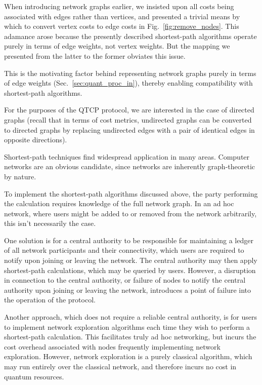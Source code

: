 When introducing network graphs earlier, we insisted upon all costs being associated with edges rather than vertices, and presented a trivial means by which to convert vertex costs to edge costs in Fig.~\ref{fig:remove_nodes}. This adamance arose because the presently described shortest-path algorithms operate purely in terms of edge weights, not vertex weights. But the mapping we presented from the latter to the former obviates this issue.

This is the motivating factor behind representing network graphs purely in terms of edge weights (Sec.~\ref{sec:quant_proc_in}), thereby enabling compatibility with shortest-path algorithms.

For the purposes of the QTCP protocol, we are interested in the case of directed graphs (recall that in terms of cost metrics, undirected graphs can be converted to directed graphs by replacing undirected edges with a pair of identical edges in opposite directions).

Shortest-path techniques find widespread application in many areas. Computer networks are an obvious candidate, since networks are inherently graph-theoretic by nature.

To implement the shortest-path algorithms discussed above, the party performing the calculation requires knowledge of the full network graph. In an ad hoc network, where users might be added to or removed from the network arbitrarily, this isn't necessarily the case.

One solution is for a central authority to be responsible for maintaining a ledger of all network participants and their connectivity, which users are required to notify upon joining or leaving the network. The central authority may then apply shortest-path calculations, which may be queried by users. However, a disruption in connection to the central authority, or failure of nodes to notify the central authority upon joining or leaving the network, introduces a point of failure into the operation of the protocol.

Another approach, which does not require a reliable central authority, is for users to implement network exploration algorithms each time they wish to perform a shortest-path calculation. This facilitates truly ad hoc networking, but incurs the cost overhead associated with nodes frequently implementing network exploration. However, network exploration is a purely classical algorithm, which may run entirely over the classical network, and therefore incurs no cost in quantum resources.


